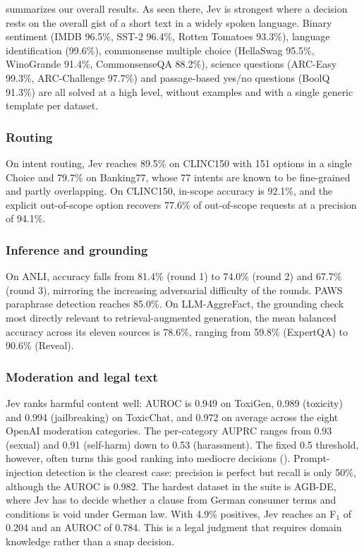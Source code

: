 \documentclass[table]{article}
\begin{document}
\begin{table}[p]
\centering
\caption{Main results on the evaluation splits. Score: primary metric (see text); 95\% bootstrap confidence interval; ECE of the first Choice or Noul question (-- for Score-only tasks).}
\label{tab:results}
\footnotesize
\setlength{\tabcolsep}{4pt}

\end{table}

 summarizes our overall results. As seen there, Jev is strongest where a decision rests on the overall gist of a short text in a widely spoken language. Binary sentiment (IMDB 96.5\%, SST-2 96.4\%, Rotten Tomatoes 93.3\%), language identification (99.6\%), commonsense multiple choice (HellaSwag 95.5\%, WinoGrande 91.4\%, CommonsenseQA 88.2\%), science questions (ARC-Easy 99.3\%, ARC-Challenge 97.7\%) and passage-based yes/no questions (BoolQ 91.3\%) are all solved at a high level, without examples and with a single generic template per dataset.

\subsubsection{Routing}
On intent routing, Jev reaches 89.5\% on CLINC150 with 151 options in a single Choice and 79.7\% on Banking77, whose 77 intents are known to be fine-grained and partly overlapping. On CLINC150, in-scope accuracy is 92.1\%, and the explicit out-of-scope option recovers 77.6\% of out-of-scope requests at a precision of 94.1\%.

\subsubsection{Inference and grounding}
On ANLI, accuracy falls from 81.4\% (round 1) to 74.0\% (round 2) and 67.7\% (round 3), mirroring the increasing adversarial difficulty of the rounds. PAWS paraphrase detection reaches 85.0\%. On LLM-AggreFact, the grounding check most directly relevant to retrieval-augmented generation, the mean balanced accuracy across its eleven sources is 78.6\%, ranging from 59.8\% (ExpertQA) to 90.6\% (Reveal).

\subsubsection{Moderation and legal text}
Jev ranks harmful content well: AUROC is 0.949 on ToxiGen, 0.989 (toxicity) and 0.994 (jailbreaking) on ToxicChat, and 0.972 on average across the eight OpenAI moderation categories. The per-category AUPRC ranges from 0.93 (sexual) and 0.91 (self-harm) down to 0.53 (harassment). The fixed 0.5 threshold, however, often turns this good ranking into mediocre decisions (). Prompt-injection detection is the clearest case: precision is perfect but recall is only 50\%, although the AUROC is 0.982. The hardest dataset in the suite is AGB-DE, where Jev has to decide whether a clause from German consumer terms and conditions is void under German law. With 4.9\% positives, Jev reaches an F$_\text{1}$ of 0.204 and an AUROC of 0.784. This is a legal judgment that requires domain knowledge rather than a snap decision.
\end{document}
